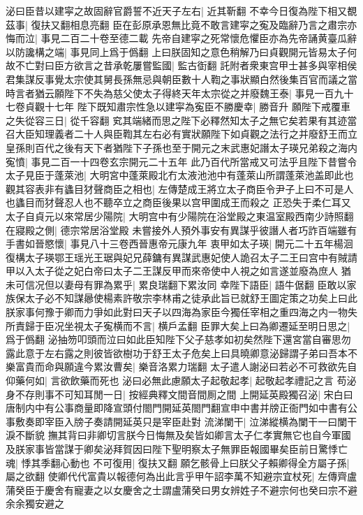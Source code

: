 泌曰臣昔以建寜之故固辭官爵誓不近天子左右|{
	近其靳翻}
不幸今日復為陛下相又覩茲事|{
	復扶又翻相息亮翻}
臣在彭原承恩無比竟不敢言建寜之寃及臨辭乃言之肅宗亦悔而泣|{
	事見二百二十卷至德二載}
先帝自建寜之死常懷危懼臣亦為先帝誦黄臺瓜辭以防讒構之端|{
	事見同上爲于僞翻}
上曰朕固知之意色稍解乃曰貞觀開元皆易太子何故不亡對曰臣方欲言之昔承乾屢嘗監國|{
	監古衘翻}
託附者衆東宫甲士甚多與宰相侯君集謀反事覺太宗使其舅長孫無忌與朝臣數十人鞫之事狀顯白然後集百官而議之當時言者猶云願陛下不失為慈父使太子得終天年太宗從之并廢魏王泰|{
	事見一百九十七卷貞觀十七年}
陛下既知肅宗性急以建寜為寃臣不勝慶幸|{
	勝音升}
願陛下戒覆車之失從容三日|{
	從千容翻}
䆒其端緒而思之陛下必釋然知太子之無它矣若果有其迹當召大臣知理義者二十人與臣鞫其左右必有實狀願陛下如貞觀之法行之并廢舒王而立皇孫則百代之後有天下者猶陛下子孫也至于開元之末武惠妃譖太子瑛兄弟殺之海内寃憤|{
	事見二百一十四卷玄宗開元二十五年}
此乃百代所當戒又可法乎且陛下昔嘗令太子見臣于蓬萊池|{
	大明宮中蓬萊殿北冇太液池池中有蓬萊山所謂蓬萊池盖即此也}
觀其容表非有蠭目犲聲商臣之相也|{
	左傳楚成王將立太子商臣令尹子上曰不可是人也蠭目而犲聲忍人也不聽卒立之商臣後果以宫甲圍成王而殺之}
正恐失于柔仁耳又太子自貞元以來常居少陽院|{
	大明宫中有少陽院在浴堂殿之東温室殿西南少詩照翻}
在寢殿之側|{
	德宗常居浴堂殿}
未嘗接外人預外事安有異謀乎彼譖人者巧詐百端雖有手書如晉愍懷|{
	事見八十三卷西晉惠帝元康九年}
衷甲如太子瑛|{
	開元二十五年楊洄復構太子瑛鄂王瑶光王琚與妃兄薛鏞有異謀武惠妃使人詭召太子二王曰宫中有賊請甲以入太子從之妃白帝曰太子二王謀反甲而來帝使中人視之如言遂並廢為庶人}
猶未可信况但以妻母有罪為累乎|{
	累良瑞翻下累汝同}
幸陛下語臣|{
	語牛倨翻}
臣敢以家族保太子必不知謀曏使楊素許敬宗李林甫之徒承此旨已就舒王圖定策之功矣上曰此朕家事何豫于卿而力爭如此對曰天子以四海為家臣今獨任宰相之重四海之内一物失所責歸于臣况坐視太子寃横而不言|{
	横戶孟翻}
臣罪大矣上曰為卿遷延至明日思之|{
	爲于僞翻}
泌抽笏叩頭而泣曰如此臣知陛下父子慈孝如初矣然陛下還宮當自審思勿露此意于左右露之則彼皆欲樹功于舒王太子危矣上曰具曉卿意泌歸謂子弟曰吾本不樂富貴而命與願違今累汝曹矣|{
	樂音洛累力瑞翻}
太子遣人謝泌曰若必不可救欲先自仰藥何如|{
	言欲飲藥而死也}
泌曰必無此慮願太子起敬起孝|{
	起敬起孝禮記之言}
苟泌身不存則事不可知耳閒一日|{
	按經典釋文間音間厠之間}
上開延英殿獨召泌|{
	宋白曰唐制内中有公事商量即降宣頭付閤門開延英閤門翻宣申中書并牓正衙門如中書有公事敷奏即宰臣入牓子奏請開延英只是宰臣赴對}
流涕闌干|{
	泣涕縱横為闌干一曰闌干淚不斷貌}
撫其背曰非卿切言朕今日悔無及矣皆如卿言太子仁孝實無它也自今軍國及朕家事皆當謀于卿矣泌拜賀因曰陛下聖明察太子無罪臣報國畢矣臣前日驚悸亡魂|{
	悸其季翻心動也}
不可復用|{
	復扶又翻}
願乞骸骨上曰朕父子賴卿得全方屬子孫|{
	屬之欲翻}
使卿代代富貴以報德何為出此言乎甲午詔李萬不知避宗宜杖死|{
	左傳齊盧蒲癸臣于慶舍有寵妻之以女慶舍之士謂盧蒲癸曰男女辨姓子不避宗何也癸曰宗不避余余獨安避之}
